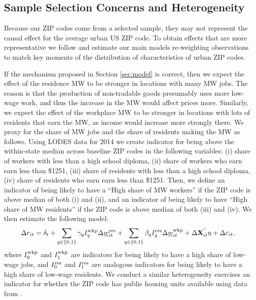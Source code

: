 \subsection{Sample Selection Concerns and Heterogeneity}\label{sec:emp_start_heterogeneity}

Because our ZIP codes come from a selected sample, they may not represent
the causal effect for the average urban US ZIP code.
To obtain effects that are more representative we follow 
\textcite{Hainmueller2012} and estimate our main models re-weighting 
observations to match key moments of the distribution of characteristics of 
urban ZIP codes.

If the mechanism proposed in Section \ref{sec:model} is correct, then we
expect the effect of the residence MW to be stronger in locations with many 
MW jobs.
The reason is that the production of non-tradable goods presumably uses more
low-wage work, and thus the increase in the MW would affect prices more.
Similarly, we expect the effect of the workplace MW to be stronger in locations
with lots of residents that earn the MW, as income would increase more strongly 
there.
We proxy for the share of MW jobs and the share of residents making the MW as follows.
Using LODES data for 2014 we create indicator for being above the within-state 
median across baseline ZIP codes in the following variables: (i) share of workers 
with less than a high school diploma, (ii) share of workers who earn earn less 
than \$1251, (iii) share of residents with less than a high school diploma, (iv) 
share of residents who earn earn less than \$1251.
Then, we define an indicator of being likely to have a ``High share of MW workers'' 
if the ZIP code is above median of both (i) and (ii), and an indicator of being likely 
to have ``High share of MW residents'' if the ZIP code is above median of both (iii) and 
(iv). We then estimate the following model:
\begin{equation}\label{eq:fd_heterogeneity}
    \Delta r_{it} = \delta_t
                  + \sum_{q\in\{0,1\}}\gamma_q I^{\text{wkp}}_q \Delta \underline{w}^{\text{res}}_{it}
                  + \sum_{q\in\{0,1\}}\beta_q I^{\text{res}}_q \Delta \underline{w}^{\text{wkp}}_{it}
                  + \Delta \mathbf{X}^{'}_{it}\eta
                  + \Delta \varepsilon_{it} ,
\end{equation}
where 
$I^{\text{wkp}}_0$ and $I^{\text{wkp}}_1$ are indicators for being likely to have a
high share of low-wage jobs, and
$I^{\text{res}}_0$ and $I^{\text{res}}_1$ are analogous indicators for being likely to 
have a high share of low-wage residents.
We conduct a similar heterogeneity exercises an indicator for whether the ZIP
code has public housing units available using data from \textcite{hudHousing}.
